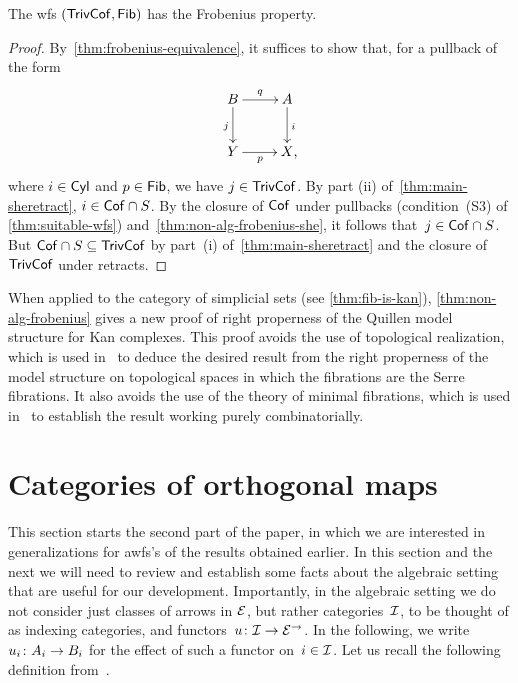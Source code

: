 \documentclass[reqno,10pt,a4paper,oneside,draft]{amsart}
\begin{document}
{{\begin{theorem} \label{thm:non-alg-frobenius}
The wfs $(\TrivCof, \Fib)$ has the Frobenius property.
\end{theorem}

\begin{proof}
By~\cref{thm:frobenius-equivalence}, it suffices to show that, for a pullback of the form
\begin{equation*}
\begin{gathered}
\xymatrix{
 B \ar[d]_j \ar[r]^q & A \ar[d]^i \\
Y \ar[r]_p & X \rlap{,}}
\end{gathered}
\end{equation*}
where $i \in \Cyl$ and $p \in \Fib$, we have $j \in \TrivCof$.
By part (ii) of~\cref{thm:main-sheretract}, $i \in \Cof \cap S$.
By the closure of $\Cof$ under pullbacks (condition~(S3) of \cref{thm:suitable-wfs}) and~\cref{thm:non-alg-frobenius-she}, it follows that~$j \in \Cof \cap S$.
But $\Cof \cap S \subseteq \TrivCof$ by part~(i) of~\cref{thm:main-sheretract} and the closure of $\TrivCof$ under retracts.
\end{proof}

\begin{example}
When applied to the category of simplicial sets (see \cref{thm:fib-is-kan}), \cref{thm:non-alg-frobenius} gives a new proof of right properness of the Quillen model structure for Kan complexes.
This proof avoids the use of topological realization, which is used in~\cite[Theorem~13.1.13]{hirschhorn-model-localizations} to deduce the desired result from the right properness of the model structure on topological spaces in which the fibrations are the Serre fibrations.
It also avoids the use of the theory of minimal fibrations, which is used in~\cite[Theorem~1.7.1]{joyal-tierney-notes} to establish the result working purely combinatorially.
\end{example}

\section{Categories of orthogonal maps}
\label{sec:ortf}

This section starts the second part of the paper, in which we are interested in generalizations for awfs's of the results obtained earlier.
In this section and the next we will need to review and establish some facts about the algebraic setting that are useful for our development.
Importantly, in the algebraic setting we do not consider just classes of arrows in $\catE$, but rather categories~$\cal{I}$, to be thought of as indexing categories, and functors~$u \co \cal{I} \to \catE^\to$.
In the following, we write $u_i \co A_i \to B_i$ for the effect of such a functor on~$i \in \cal{I}$.
Let us recall the following definition from~\cite{garner:small-object-argument}.

}}
\end{document}
